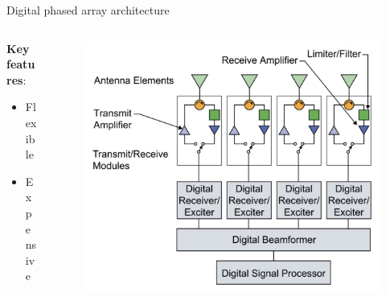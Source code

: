 \documentclass[../main.tex]{subfiles}
\begin{document}
\begin{frame}[t]{Digital phased array architecture}

\begin{columns}[t]
    \begin{column}{0.3\textwidth}
    \textbf{Key features}:
    \begin{itemize}
        \item Flexible
        \item Expensive
    \end{itemize}        
    \end{column}
    \begin{column}{0.7\textwidth}
        \begin{figure}[H]
        \begin{adjustbox}{width=0.75\linewidth}
        \includegraphics{pics/antenna_structure.jpg}
        \end{adjustbox}
        \end{figure}
    \end{column}
\end{columns}

\end{frame}



%
%
\end{document}
